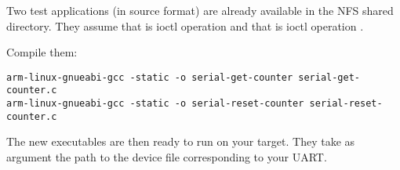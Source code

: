 Two test applications (in source format) are already available in the
 NFS shared directory.
They assume that  is ioctl operation 
and that  is ioctl operation .

Compile them:

\begin{verbatim}
arm-linux-gnueabi-gcc -static -o serial-get-counter serial-get-counter.c
arm-linux-gnueabi-gcc -static -o serial-reset-counter serial-reset-counter.c
\end{verbatim}

The new executables are then ready to run on your target. They take as
argument the path to the device file corresponding to your UART.
